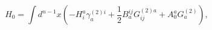 \begin{equation}
H_{0}=\int d^{n-1}x\left( -H_{i}^{a}\gamma _{a}^{(2)i}+\frac{1}{2}%
B_{a}^{ij}G_{ij}^{(2)a}+A_{0}^{a}G_{a}^{(2)}\right) ,  \label{f6}
\end{equation}

